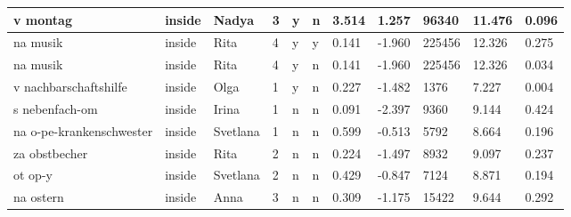 \begin{longtable}{|p{4cm}|p{1cm}|p{1.2cm}|p{0.5cm}|p{0.5cm}|p{0.5cm}|R{1cm}|R{1cm}|R{1cm}|R{1cm}|R{1cm}|}
v montag                   & inside            & Nadya         & 3                                   & y                          & n                          & 3.514      & 1.257         & 96340                   & 11.476                        & 0.096                   \\ \hline
na musik                   & inside            & Rita          & 4                                   & y                          & y                          & 0.141      & -1.960        & 225456                  & 12.326                        & 0.275                   \\ \hline
na musik                   & inside            & Rita          & 4                                   & y                          & n                          & 0.141      & -1.960        & 225456                  & 12.326                        & 0.034                   \\ \hline
v nachbarschaftshilfe      & inside            & Olga          & 1                                   & y                          & n                          & 0.227      & -1.482        & 1376                    & 7.227                         & 0.004                   \\ \hline
s nebenfach-om             & inside            & Irina         & 1                                   & n                          & n                          & 0.091      & -2.397        & 9360                    & 9.144                         & 0.424                   \\ \hline
na o-pe-krankenschwester   & inside            & Svetlana      & 1                                   & n                          & n                          & 0.599      & -0.513        & 5792                    & 8.664                         & 0.196                   \\ \hline
za obstbecher              & inside            & Rita          & 2                                   & n                          & n                          & 0.224      & -1.497        & 8932                    & 9.097                         & 0.237                   \\ \hline
ot op-y                    & inside            & Svetlana      & 2                                   & n                          & n                          & 0.429      & -0.847        & 7124                    & 8.871                         & 0.194                   \\ \hline
na ostern                  & inside            & Anna          & 3                                   & n                          & n                          & 0.309      & -1.175        & 15422                   & 9.644                         & 0.292                   \\ \hline

\end{longtable}
